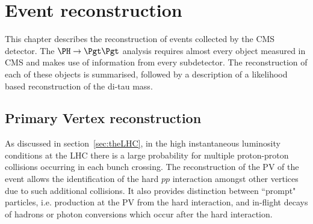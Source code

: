 \chapter{Event reconstruction}
\label{chap:reco}

This chapter describes the reconstruction of events collected by the CMS
detector. The $\PH \to \Pgt\Pgt$ analysis requires almost every object measured in
CMS and makes use of information from every subdetector. The reconstruction of
each of these objects is summarised, followed by a description of a likelihood based
reconstruction of the di-tau mass. 



\section{Primary Vertex reconstruction}
\label{sec:vertex}

As discussed in section~\ref{sec:theLHC}, in the high instantaneous luminosity
conditions at the LHC there is a large probability for multiple proton-proton
collisions occurring in each bunch crossing. 
The reconstruction of the \ac{PV} of the event allows the identification of the hard
$pp$ interaction amongst other vertices due to such additional collisions. 
It also provides distinction between ``prompt" particles, i.e. production at the \ac{PV} from the hard
interaction, and in-flight decays of hadrons or photon conversions which occur
after the hard interaction.  

